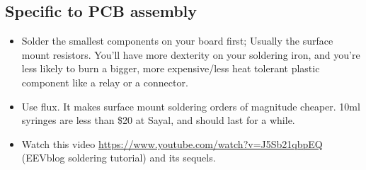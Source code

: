 \documentclass{article}
\begin{document}
\subsection{Specific to PCB assembly}
\begin{itemize}
\item Solder the smallest components on your board first; Usually the surface mount resistors. You'll have more dexterity on your soldering iron, and you're less likely to burn a bigger, more expensive/less heat tolerant plastic component like a relay or a connector.
\item Use flux. It makes surface mount soldering orders of magnitude cheaper. 10ml syringes are less than \$20 at Sayal, and should last for a while.
\item Watch this video \url{https://www.youtube.com/watch?v=J5Sb21qbpEQ} (EEVblog soldering tutorial) and its sequels.
\end{itemize}
\end{document}
